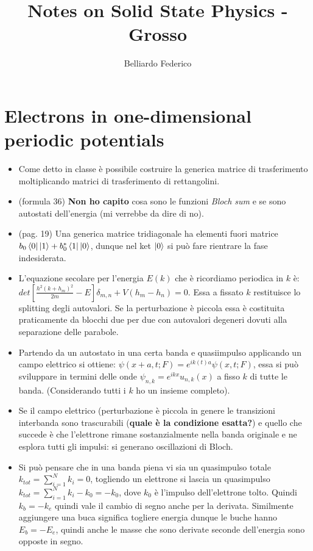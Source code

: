 \documentclass[10pt,a4paper]{article}
\author{Belliardo Federico}
\title{Notes on Solid State Physics - Grosso}
\begin{document}
\maketitle
\section{Electrons in one-dimensional periodic potentials}
\begin{itemize}
\item Come detto in classe è possibile costruire la generica matrice di trasferimento moltiplicando matrici di trasferimento di rettangolini.
\item (formula 36) \textbf{Non ho capito} cosa sono le funzioni \textit{Bloch sum} e se sono autostati dell'energia (mi verrebbe da dire di no). 
\item (pag. 19) Una generica matrice tridiagonale ha elementi fuori matrice $b_0\bra{0} \ket{1} + b_0^{*} \bra{1} \ket{0}$, dunque nel ket $\ket{0}$ si può fare rientrare la fase indesiderata.
\item L'equazione secolare per l'energia $E(k)$ che è ricordiamo periodica in $k$ è: $det [\frac{h^2(k+h_m)^2}{2 m} - E] \delta_{m, n} + V(h_m - h_n) = 0$. Essa a fissato $k$ restituisce lo splitting degli autovalori. Se la perturbazione è piccola essa è costituita praticamente da blocchi due per due con autovalori degeneri dovuti alla separazione delle parabole.
\item Partendo da un autostato in una certa banda e quasiimpulso applicando un campo elettrico si ottiene: $\psi(x+a, t; F) = e^{i k(t) a} \psi(x, t;F)$, essa si può sviluppare in termini delle onde $\psi_{n, k} = e^{i k x} u_{n, k} (x)$ a fisso $k$ di tutte le banda. (Considerando tutti i $k$ ho un insieme completo). 
\item Se il campo elettrico (perturbazione è piccola in genere le transizioni interbanda sono trascurabili (\textbf{quale è la condizione esatta?}) e quello che succede è che l'elettrone rimane sostanzialmente nella banda originale e ne esplora tutti gli impulsi: si generano oscillazioni di Bloch.
\item Si può pensare che in una banda piena vi sia un quasimpulso totale $k_{tot} = \sum_{i=1}^{N} k_i = 0$, togliendo un elettrone si lascia un quasimpulso $k_{tot} = \sum_{i=1}^{N} k_i - k_0 = - k_0$, dove $k_0$ è l'impulso dell'elettrone tolto. Quindi $k_{b} = -k_{e}$ quindi vale il cambio di segno anche per la derivata.
Similmente aggiungere una buca significa togliere energia dunque le buche hanno $E_{b} = -E_{e}$, quindi anche le masse che sono derivate seconde dell'energia sono opposte in segno.
\end{itemize}
\end{document}
